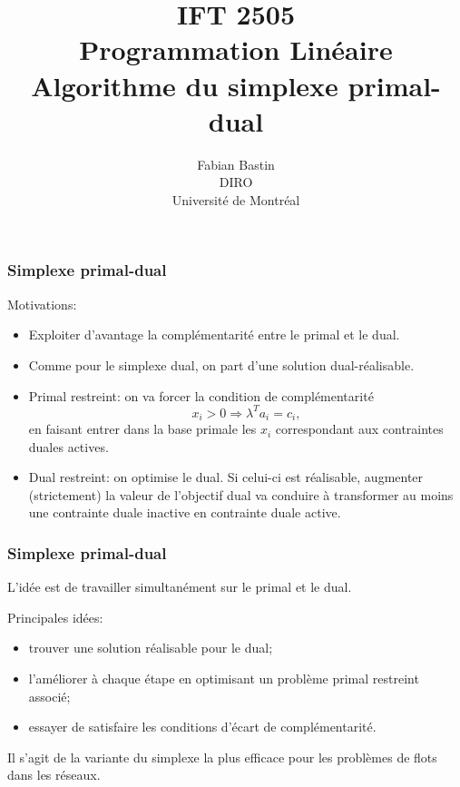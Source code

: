 \documentclass[t,usepdftitle=false]{beamer}
\title[IFT2505]{IFT 2505\\Programmation Linéaire\\Algorithme du simplexe primal-dual}
\author[Fabian Bastin]{Fabian Bastin\\DIRO\\Université de Montréal}
\date{}
\begin{document}
\frame{\titlepage}

\begin{frame}
\frametitle{Simplexe primal-dual}

Motivations:
\begin{itemize}
\item
Exploiter d'avantage la complémentarité entre le primal et le dual.
\item
Comme pour le simplexe dual, on part d'une solution dual-réalisable.
\item
Primal restreint: on va forcer la condition de complémentarité
\[
x_i > 0 \Rightarrow \lambda^T a_i = c_i,
\]
en faisant entrer dans la base primale les $x_i$ correspondant aux contraintes duales actives.
\item
Dual restreint: on optimise le dual. Si celui-ci est réalisable, augmenter (strictement) la valeur de l'objectif dual va conduire à transformer au moins une contrainte duale inactive en contrainte duale active.
\end{itemize}

\end{frame}

\begin{frame}
\frametitle{Simplexe primal-dual}

L'idée est de travailler simultanément sur le primal et le dual.

\mbox{}

Principales idées:
\begin{itemize}
\item
trouver une solution réalisable pour le dual;
\item
l'améliorer à chaque étape en optimisant un problème primal restreint associé;
\item
essayer de satisfaire les conditions d'écart de complémentarité.
\end{itemize}

\mbox{}

Il s'agit de la variante du simplexe la plus efficace pour les problèmes de flots dans les réseaux.

\end{frame}
\end{document}
